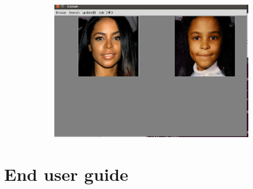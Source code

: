 \documentclass[pdftex,10pt,a4paper,oneside]{article}
\begin{document}
	\begin{figure}[H]
	\centering
	\includegraphics[width=120mm,height=60mm]{fig/13.png}
\end{figure}
	\pagebreak
	\section{End user guide}
\end{document}
